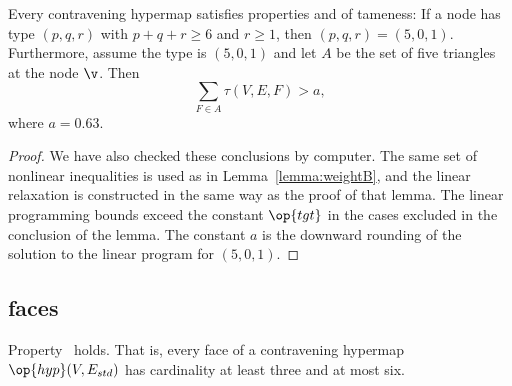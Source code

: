 \begin{lemma}[]\label{lemma:degE}
  Every contravening hypermap satisfies properties 
  and 
  of tameness: If a node has type $(p,q,r)$ with $p+q+r\ge 6$ and
  $r\ge 1$, then $(p,q,r)=(5,0,1)$.  Furthermore, assume the type is
  $(5,0,1)$ and let $A$ be the set of five triangles at the node $\v$.
  Then %
\[ 
\sum_{F\in A} \tau(V,E,F) > a,
\] 
where $a=0.63$.
\end{lemma}



\begin{proof} We have also checked these conclusions by computer.  The
  same set of nonlinear inequalities is used as in
  Lemma~\ref{lemma:weightB}, and the linear relaxation is constructed
  in the same way as the proof of that lemma.  The linear programming
  bounds exceed the constant $\op{tgt}$ in the cases excluded in the
  conclusion of the lemma.  The constant $a$ is the downward rounding
  of the solution to the linear program for $(5,0,1)$.
\end{proof}
%

%

\subsection{faces}



\begin{lemma}[]  \label{lemma:face-size}
  Property~ holds.  That is, every face of a
  contravening hypermap $\op{hyp}(V,E_{std})$ has cardinality at least
  three and at most six.
\end{lemma}

